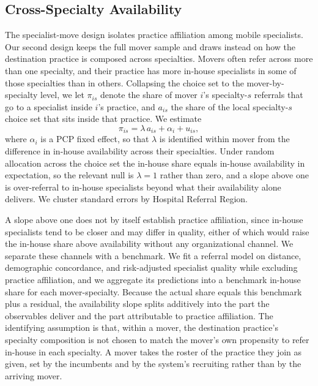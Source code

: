 \documentclass[12pt]{article}
\begin{document}
\subsection{Cross-Specialty Availability}
\label{sec:availability}

The specialist-move design isolates practice affiliation among mobile specialists. Our second design keeps the full mover sample and draws instead on how the destination practice is composed across specialties. Movers often refer across more than one specialty, and their practice has more in-house specialists in some of those specialties than in others. Collapsing the choice set to the mover-by-specialty level, we let $\pi_{is}$ denote the share of mover $i$'s specialty-$s$ referrals that go to a specialist inside $i$'s practice, and $a_{is}$ the share of the local specialty-$s$ choice set that sits inside that practice. We estimate
\begin{equation}\label{eq:avail}
 \pi_{is} = \lambda\,a_{is} + \alpha_i + u_{is},
\end{equation}
where $\alpha_i$ is a PCP fixed effect, so that $\lambda$ is identified within mover from the difference in in-house availability across their specialties. Under random allocation across the choice set the in-house share equals in-house availability in expectation, so the relevant null is $\lambda = 1$ rather than zero, and a slope above one is over-referral to in-house specialists beyond what their availability alone delivers. We cluster standard errors by Hospital Referral Region.

A slope above one does not by itself establish practice affiliation, since in-house specialists tend to be closer and may differ in quality, either of which would raise the in-house share above availability without any organizational channel. We separate these channels with a benchmark. We fit a referral model on distance, demographic concordance, and risk-adjusted specialist quality while excluding practice affiliation, and we aggregate its predictions into a benchmark in-house share for each mover-specialty. Because the actual share equals this benchmark plus a residual, the availability slope splits additively into the part the observables deliver and the part attributable to practice affiliation. The identifying assumption is that, within a mover, the destination practice's specialty composition is not chosen to match the mover's own propensity to refer in-house in each specialty. A mover takes the roster of the practice they join as given, set by the incumbents and by the system's recruiting rather than by the arriving mover.
\end{document}
